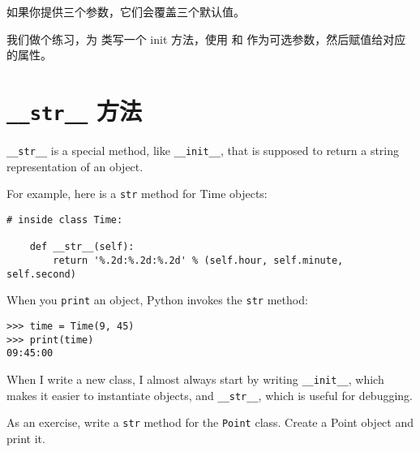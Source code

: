 %

如果你提供三个参数，它们会覆盖三个默认值。


我们做个练习，为  类写一个 init 方法，使用  和  作为可选参数，然后赋值给对应的属性。
  


\section{ {\tt \_\_str\_\_} 方法}

  

\verb"__str__" is a special method, like \verb"__init__",
that is supposed to return a string representation of an object.

For example, here is a {\tt str} method for Time objects:

\begin{lstlisting}
# inside class Time:

    def __str__(self):
        return '%.2d:%.2d:%.2d' % (self.hour, self.minute, self.second)
\end{lstlisting}

%
When you {\tt print} an object, Python invokes the {\tt str} method:

\begin{lstlisting}
>>> time = Time(9, 45)
>>> print(time)
09:45:00
\end{lstlisting}

%
When I write a new class, I almost always start by writing
\verb"__init__", which makes it easier to instantiate objects, and
\verb"__str__", which is useful for debugging.

As an exercise, write a {\tt str} method for the {\tt Point} class.
Create a Point object and print it.


